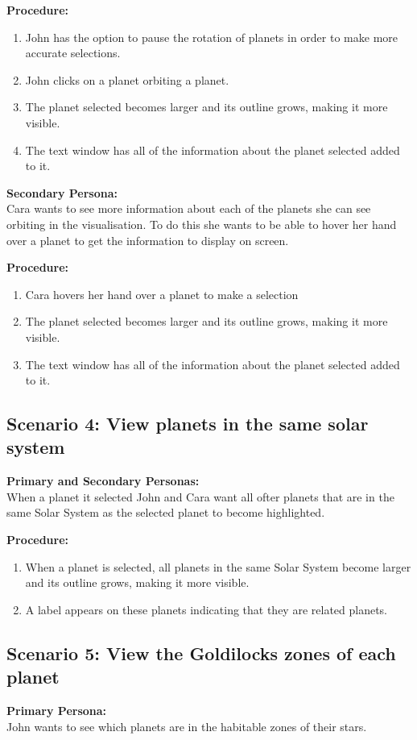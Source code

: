   {\bf  Procedure:}
   \begin{enumerate}
 \item John has the option to pause the rotation of planets in order to make more accurate selections. 
 \item John clicks on a planet orbiting a planet.
\item The planet selected becomes larger and its outline grows, making it more visible.
\item The text window has all of the information about the planet selected added to it.
 \end{enumerate}
   {\bf  Secondary Persona:}\\
 Cara wants to see more information about each of the planets she can see orbiting in the visualisation. To do this she wants to be able to hover her hand over a planet to get the information to display on screen.
 
  {\bf  Procedure:}
   \begin{enumerate}
 \item Cara hovers her hand over a planet to make a selection
 \item The planet selected becomes larger and its outline grows, making it more visible.
\item The text window has all of the information about the planet selected added to it.
 \end{enumerate}
 \subsection{Scenario 4: View planets in the same solar system}
   {\bf  Primary and Secondary Personas:}\\
 When a planet it selected John and Cara want all ofter planets that are in the same Solar System as the selected planet to become highlighted.
 
  {\bf  Procedure:}
   \begin{enumerate}
 \item When a planet is selected, all planets in the same Solar System become larger and its outline grows, making it more visible.
 \item A label appears on these planets indicating that they are related planets.
 \end{enumerate}
 \subsection{Scenario 5: View the Goldilocks zones of each planet}
   {\bf  Primary Persona:}\\
 John wants to see which planets are in the habitable zones of their stars. 
 
